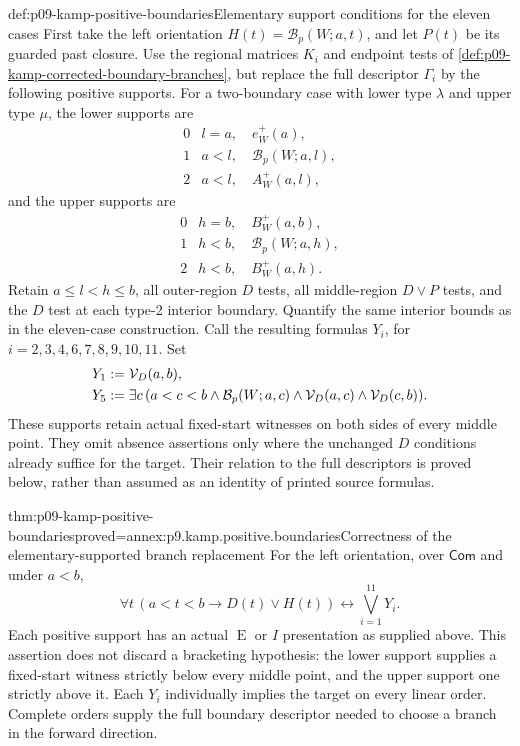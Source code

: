 \begin{hbdefinition}{def:p09-kamp-positive-boundaries}{Elementary support conditions for the eleven cases}
First take the left orientation \(H(t)=\mathcal B_p(W;a,t)\),
and let \(P(t)\) be its guarded past closure. Use the regional
matrices \(K_i\) and endpoint tests of
\cref{def:p09-kamp-corrected-boundary-branches}, but replace the
full descriptor \(\Gamma_i\) by the following positive supports.
For a two-boundary case with lower type \(\lambda\) and upper
type \(\mu\), the lower supports are
\[
 \begin{array}{c|l}
 0&l=a,\quad e_W^+(a),\\
 1&a<l,\quad\mathcal B_p(W;a,l),\\
 2&a<l,\quad A_W^+(a,l),
 \end{array}
\]
and the upper supports are
\[
 \begin{array}{c|l}
 0&h=b,\quad B_W^+(a,b),\\
 1&h<b,\quad\mathcal B_p(W;a,h),\\
 2&h<b,\quad B_W^+(a,h).
 \end{array}
\]
Retain \(a\leq l<h\leq b\), all outer-region \(D\) tests,
all middle-region \(D\lor P\) tests, and the \(D\) test at
each type-2 interior boundary. Quantify the same interior bounds
as in the eleven-case construction. Call the resulting formulas
\(Y_i\), for \(i=2,3,4,6,7,8,9,10,11\).
Set
\[
\begin{aligned}
 Y_1&\mathrel{:=}\mathcal V_D(a,b),\\
 Y_5&\mathrel{:=}\exists c\,(a<c<b\land\mathcal B_p(W;a,c)
                    \land\mathcal V_D(a,c)\land\mathcal V_D(c,b)).
\end{aligned}
\]
These supports retain actual fixed-start witnesses on both sides of
every middle point. They omit absence assertions only where the
unchanged \(D\) conditions already suffice for the target.
Their relation to the full descriptors is proved below, rather than
assumed as an identity of printed source formulas.
\end{hbdefinition}

\begin{hblemma}{thm:p09-kamp-positive-boundaries}{proved=annex:p9.kamp.positive.boundaries}{Correctness of the elementary-supported branch replacement}
For the left orientation, over \(\mathsf{Com}\) and under
\(a<b\),
\[
 \forall t\,(a<t<b\to D(t)\lor H(t))
                  \longleftrightarrow\bigvee_{i=1}^{11}Y_i.
\]
Each positive support has an actual \(\operatorname{E}\) or
\(I\) presentation as supplied above. This assertion does not
discard a bracketing hypothesis: the lower support supplies a
fixed-start witness strictly below every middle point, and the
upper support one strictly above it. Each \(Y_i\) individually
implies the target on every linear order. Complete orders supply
the full boundary descriptor needed to choose a branch in the
forward direction.
\end{hblemma}

